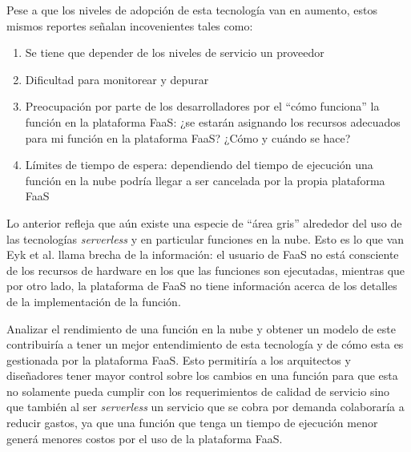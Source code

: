 Pese a que los niveles de adopción de esta tecnología van en aumento, estos mismos reportes señalan incovenientes tales como:
\begin{enumerate}
    \item Se tiene que depender de los niveles de servicio un proveedor
    \item Dificultad para monitorear y depurar
    \item Preocupación por parte de los desarrolladores por el ``cómo funciona'' la función en la plataforma FaaS: ¿se estarán asignando los recursos adecuados para mi función en la plataforma FaaS? ¿Cómo y cuándo se hace?
    \item Límites de tiempo de espera: dependiendo del tiempo de ejecución una función en la nube podría llegar a ser cancelada por la propia plataforma FaaS
\end{enumerate}

Lo anterior refleja que aún existe una especie de ``área gris'' alrededor del uso de las tecnologías \emph{serverless} y en particular funciones en la nube. Esto es lo que van Eyk et al.\cite{vanEyk:2018:SRC:3185768.3186308} llama brecha de la información: el usuario de FaaS no está consciente de los recursos de hardware en los que las funciones son ejecutadas, mientras que por otro lado, la plataforma de FaaS no tiene información acerca de los detalles de la implementación de la función.

Analizar el rendimiento de una función en la nube y obtener un modelo de este contribuiría a tener un mejor entendimiento de esta tecnología y de cómo esta es gestionada por la plataforma FaaS. Esto permitiría a los arquitectos y diseñadores tener mayor control sobre los cambios en una función para que esta no solamente pueda cumplir con los requerimientos de calidad de servicio sino que también al ser \emph{serverless} un servicio que se cobra por demanda colaboraría a reducir gastos, ya que una función que tenga un tiempo de ejecución menor generá menores costos por el uso de la plataforma FaaS.

